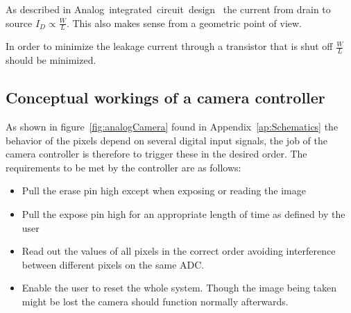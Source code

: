 As described in Analog~integrated~circuit~design~\cite{AnalogBook} the current from drain to source $I_D \propto \frac{W}{L}$.
This also makes sense from a geometric point of view.

In order to minimize the leakage current through a transistor that is shut off $\frac{W}{L}$ should be minimized.

\subsection{Conceptual workings of a camera controller}

As shown in figure~\ref{fig:analogCamera} found in Appendix~\ref{ap:Schematics} the behavior of the pixels depend on several digital input signals,
the job of the camera controller is therefore to trigger these in the desired order.
The requirements to be met by the controller are as follows:

\begin{itemize}
\item Pull the erase pin high except when exposing or reading the image
\item Pull the expose pin high for an appropriate length of time as defined by the user
\item Read out the values of all pixels in the correct order avoiding interference between different pixels on the same ADC.
\item Enable the user to reset the whole system. Though the image being taken might be lost the camera should function normally afterwards.
\end{itemize}
